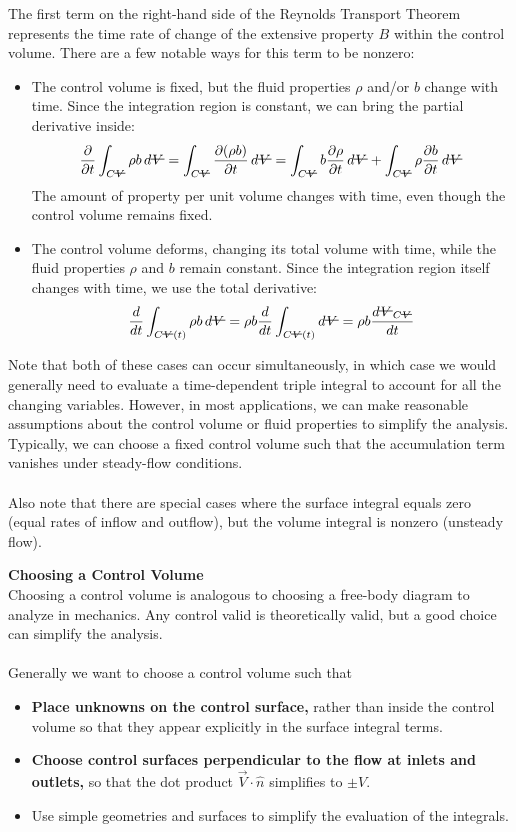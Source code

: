 ﻿\documentclass[12pt]{article}
\newcommand{\vol}{\mathord{\text{\ooalign{\hidewidth $V$\hidewidth\cr\kern-0.5pt\raisebox{0.8ex}{\rule[0pt]{1em}{0.5pt}}}}}}
\begin{document}
\begin{notebox}
The first term on the right-hand side of the Reynolds Transport Theorem represents the time rate of change of the extensive property $B$ within the control volume. There are a few notable ways for this term to be nonzero:
\begin{itemize}
\item The control volume is fixed, but the fluid properties $\rho$ and/or $b$ change with time. Since the integration region is constant, we can bring the partial derivative inside:
\[\frac{\partial}{\partial t} \int_{C\vol} \rho b \, d\vol = \int_{C\vol} \frac{\partial(\rho b)}{\partial t} \, d\vol = \int_{C\vol} b\frac{\partial\rho}{\partial t} \, d\vol + \int_{C\vol} \rho\frac{\partial b}{\partial t} \, d\vol\]
The amount of property per unit volume changes with time, even though the control volume remains fixed.
\item The control volume deforms, changing its total volume with time, while the fluid properties $\rho$ and $b$ remain constant. Since the integration region itself changes with time, we use the total derivative:
\[\frac{d}{dt} \int_{C\vol(t)} \rho b \, d\vol = \rho b \frac{d}{dt} \int_{C\vol(t)} d\vol = \rho b \frac{d\vol_{C\vol}}{dt}\]
\end{itemize}
Note that both of these cases can occur simultaneously, in which case we would generally need to evaluate a time-dependent triple integral to account for all the changing variables. However, in most applications, we can make reasonable assumptions about the control volume or fluid properties to simplify the analysis. Typically, we can choose a fixed control volume such that the accumulation term vanishes under steady-flow conditions.\\\\
Also note that there are special cases where the surface integral equals zero (equal rates of inflow and outflow), but the volume integral is nonzero (unsteady flow).
\end{notebox}
\textbf{Choosing a Control Volume}\\
Choosing a control volume is analogous to choosing a free-body diagram to analyze in mechanics. Any control valid is theoretically valid, but a good choice can simplify the analysis.\\\\
Generally we want to choose a control volume such that
\begin{itemize}
    \item \textbf{Place unknowns on the control surface,} rather than inside the control volume so that they appear explicitly in the surface integral terms.
    \item \textbf{Choose control surfaces perpendicular to the flow at inlets and outlets,} so that the dot product $\vec{V}\cdot\hat{n}$ simplifies to $\pm V$.
    \item Use simple geometries and surfaces to simplify the evaluation of the integrals.
\end{itemize}
\end{document}
